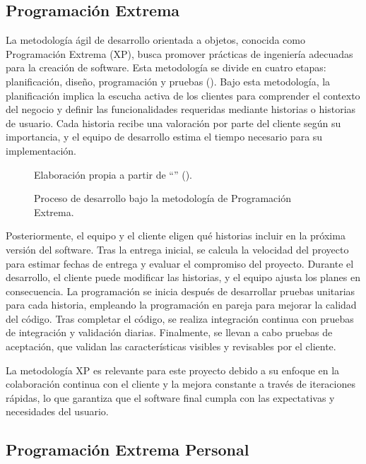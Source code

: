 \subsection{Programación Extrema}
La metodología ágil de desarrollo orientada a objetos, conocida como Programación Extrema (XP), busca promover prácticas de ingeniería adecuadas para la creación de software. Esta metodología se divide en cuatro etapas: planificación, diseño, programación y pruebas (\cite{pressman2005software}). Bajo esta metodología, la planificación implica la escucha activa de los clientes para comprender el contexto del negocio y definir las funcionalidades requeridas mediante historias o historias de usuario. Cada historia recibe una valoración por parte del cliente según su importancia, y el equipo de desarrollo estima el tiempo necesario para su implementación.
\begin{figure}[htb]
	\centering
    
	\caption{Proceso de desarrollo bajo la metodología de Programación Extrema.}
	\footnotesize{{Elaboración propia a partir de ``\textit{}'' (\citeyear{pressman2005software}).}}
	\label{fig:modelo_desarrollo_xp} 
\end{figure}
Posteriormente, el equipo y el cliente eligen qué historias incluir en la próxima versión del software. Tras la entrega inicial, se calcula la velocidad del proyecto para estimar fechas de entrega y evaluar el compromiso del proyecto. Durante el desarrollo, el cliente puede modificar las historias, y el equipo ajusta los planes en consecuencia. La programación se inicia después de desarrollar pruebas unitarias para cada historia, empleando la programación en pareja para mejorar la calidad del código. Tras completar el código, se realiza integración continua con pruebas de integración y validación diarias. Finalmente, se llevan a cabo pruebas de aceptación, que validan las características visibles y revisables por el cliente.

La metodología XP es relevante para este proyecto debido a su enfoque en la colaboración continua con el cliente y la mejora constante a través de iteraciones rápidas, lo que garantiza que el software final cumpla con las expectativas y necesidades del usuario.

\subsection{Programación Extrema Personal}


